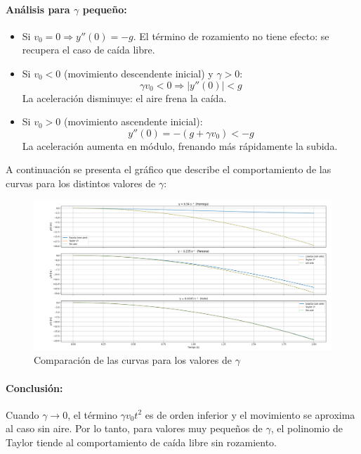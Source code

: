 \documentclass{article}
\begin{document}
\paragraph{Análisis para \( \gamma \) pequeño:}

\begin{itemize}
    \item Si \( v_0 = 0 \Rightarrow y''(0) = -g \). El término de rozamiento no tiene efecto: se recupera el caso de caída libre.
    \item Si \( v_0 < 0 \) (movimiento descendente inicial) y \( \gamma > 0 \): 
    \[
    \gamma v_0 < 0 \Rightarrow |y''(0)| < g
    \]
    La aceleración disminuye: el aire frena la caída.
    \item Si \( v_0 > 0 \) (movimiento ascendente inicial): 
    \[
    y''(0) = -(g + \gamma v_0) < -g
    \]
    La aceleración aumenta en módulo, frenando más rápidamente la subida.
\end{itemize}

A continuación se presenta el gráfico que describe el comportamiento de las curvas para los distintos valores de \( \gamma \):
\begin{figure}[H]
    \centering
    \includegraphics[width=1\textwidth]{assets/comparacion_curva_3modelos.png}
    \caption{Comparación de las curvas para los valores de \( \gamma \)}
\end{figure}

\paragraph{Conclusión:} 
Cuando \( \gamma \to 0 \), el término \( \gamma v_0 t^2 \) es de orden inferior y el movimiento se aproxima al caso sin aire. Por lo tanto, para valores muy pequeños de \( \gamma \), el polinomio de Taylor tiende al comportamiento de caída libre sin rozamiento.
\end{document}

